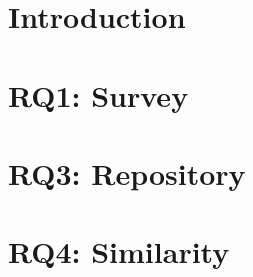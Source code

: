 \section{Introduction}







\section{RQ1: Survey}



\section{RQ3: Repository}



\section{RQ4:  Similarity}


